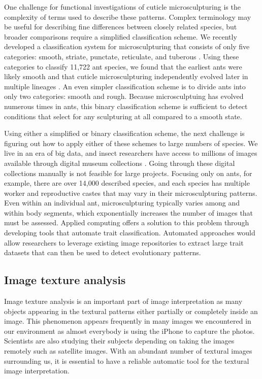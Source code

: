 \documentclass{aci}
\numberwithin{equation}{section}
\begin{document}
One challenge for functional investigations of cuticle microsculpturing is the
complexity of terms used to describe these patterns. Complex terminology may be
useful for describing fine differences between closely related species, but
broader comparisons require a simplified classification scheme. We recently
developed a classification system for microsculpturing that consists of only
five categories: smooth, striate, punctate, reticulate, and tuberous
\cite{hellenbrand_ant_2022}. Using these categories to classify 11,722 ant
species, we found that the earliest ants were likely smooth and that cuticle
microsculpturing independently evolved later in multiple lineages
\cite{hellenbrand_ant_2022}. An even simpler classification scheme is to divide
ants into only two categories: smooth and rough. Because microsculptuing has
evolved numerous times in ants, this binary classification scheme is sufficient
to detect conditions that select for any sculpturing at all compared to a smooth
state.

Using either a simplified or binary classification scheme, the next challenge is
figuring out how to apply either of these schemes to large numbers of species.
We live in an era of big data, and insect researchers have access to millions of
images available through digital museum collections \cite{beaman_mass_2012}.
Going through these digital collections manually is not feasible for large
projects. Focusing only on ants, for example, there are over 14,000 described
species, and each species has multiple worker and reproductive castes that may
vary in their microsculpturing patterns. Even within an individual ant,
microsculpturing typically varies among and within body segments, which
exponentially increases the number of images that must be assessed. Applied
computing offers a solution to this problem through developing tools that
automate trait classification. Automated approaches would allow researchers to
leverage existing image repositories to extract large trait datasets that can
then be used to detect evolutionary patterns.


\subsection{Image texture analysis}

Image texture analysis is an important part of image interpretation as many
objects appearing in the textural patterns either partially or completely inside
an image. This phenomenon appears frequently in many images we encountered in
our environment as almost everybody is using the iPhone to capture the photos.
Scientists are also studying their subjects depending on taking the images
remotely such as satellite images. With an abundant number of textural images
surrounding us, it is essential to have a reliable automatic tool for the
textural image interpretation.
\end{document}

